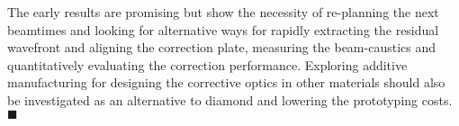 \begin{refsection}
The early results are promising but show the necessity of re-planning the next beamtimes and looking for alternative ways for rapidly extracting the residual wavefront and aligning the correction plate, measuring the beam-caustics and quantitatively evaluating the correction performance. Exploring additive manufacturing for designing the corrective optics in other materials should also be investigated as an alternative to diamond and lowering the prototyping costs. $\blacksquare$

\printbibliography[heading=subbibliography]
\end{refsection}